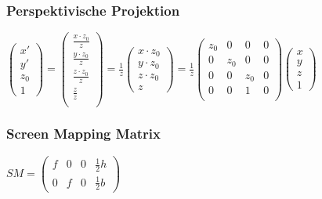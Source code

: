 \documentclass{article}
\begin{document}
\subsubsection*{Perspektivische Projektion}
\begin{center}
	$\begin{pmatrix}
        x'\\
        y'\\
        z_0\\
        1
      \end{pmatrix}
      =
      \begin{pmatrix}
        \frac{x\cdot z_0}{z}\\
        \frac{y\cdot z_0}{z}\\
        \frac{z\cdot z_0}{z}\\
        \frac{z}{z}\\
      \end{pmatrix}
      =
      \frac{1}{z}
      \begin{pmatrix}
        x\cdot z_0\\
        y\cdot z_0\\
        z\cdot z_0\\
        z
      \end{pmatrix}
      = \frac{1}{z}
      \begin{pmatrix}
        z_0 & 0 & 0 & 0\\
        0 & z_0 & 0 & 0\\
        0 & 0 & z_0 & 0\\
        0 & 0 & 1 & 0\\
      \end{pmatrix}
      \begin{pmatrix}
        x\\y\\z\\1
      \end{pmatrix}
      $
\end{center}
\subsubsection*{Screen Mapping Matrix}
\begin{center}
	$SM = \begin{pmatrix}
        f & 0 & 0 & \frac{1}{2}h\\
        0 & f & 0 & \frac{1}{2}b
      \end{pmatrix}$
\end{center}
\end{document}
